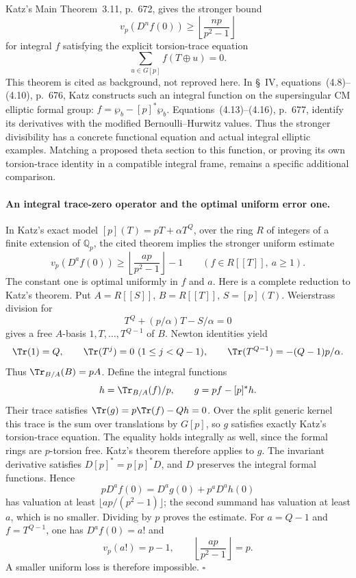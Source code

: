 \documentclass[11pt]{article}
\newcommand{\Q}{\mathbb Q}\newcommand{\C}{\mathbb C}\newcommand{\Z}{\mathbb Z}\newcommand{\R}{\mathbb R}\newcommand{\A}{\mathbb A}\newcommand{\OO}{\mathcal O}
\theoremstyle{definition}\newtheorem{definition}[theorem]{Definition}\newtheorem{remark}[theorem]{Remark}
\begin{document}
Katz's Main Theorem~3.11, p.~672, gives the stronger bound
\[
 v_p(D^nf(0))\geq\left\lfloor\frac{np}{p^2-1}\right\rfloor
\]
for integral $f$ satisfying the explicit torsion-trace equation
\[
 \sum_{u\in G[p]}f(T\mathbin\oplus u)=0.
\]
This theorem is cited as background, not reproved here.
In \S~IV, equations~(4.8)--(4.10), p.~676, Katz constructs such an
integral function on the supersingular CM elliptic formal group:
$f=\wp_b-[p]^*\wp_b$. Equations~(4.13)--(4.16), p.~677, identify
its derivatives with the modified Bernoulli--Hurwitz values.
Thus the stronger divisibility has a concrete functional equation
and actual integral elliptic examples. Matching a proposed theta
section to this function, or proving its own torsion-trace identity
in a compatible integral frame, remains a specific additional
comparison.

\paragraph{An integral trace-zero operator and the optimal uniform error one.}
In Katz's exact model $[p](T)=pT+\alpha T^Q$, over the ring $R$
of integers of a finite extension of $\Q_p$, the cited theorem
implies the stronger uniform estimate
\[
 v_p(D^af(0))\geq
       \left\lfloor\frac{ap}{p^2-1}\right\rfloor-1
       \qquad(f\in R[[T]],\ a\geq1).
\]
The constant one is optimal uniformly in $f$ and $a$.
Here is a complete reduction to Katz's theorem. Put
$A=R[[S]]$, $B=R[[T]]$, $S=[p](T)$. Weierstrass division for
\[
 T^Q+(p/\alpha)T-S/\alpha=0
\]
gives a free $A$-basis $1,T,\ldots,T^{Q-1}$ of $B$.
Newton identities yield
\[
 \Tr(1)=Q,\qquad \Tr(T^j)=0\ (1\leq j<Q-1),\qquad
 \Tr(T^{Q-1})=-(Q-1)p/\alpha.
\]
Thus $\Tr_{B/A}(B)=pA$. Define the integral functions
\[
 h=\Tr_{B/A}(f)/p,\qquad
 g=pf-[p]^*h.
\]
Their trace satisfies $\Tr(g)=p\Tr(f)-Qh=0$.
Over the split generic kernel this trace is the sum over translations
by $G[p]$, so $g$ satisfies exactly Katz's torsion-trace equation.
The equality holds integrally as well, since the formal rings are
$p$-torsion free. Katz's theorem therefore applies to $g$.
The invariant derivative satisfies $D[p]^*=p[p]^*D$, and $D$
preserves the integral formal functions. Hence
\[
 pD^af(0)=D^ag(0)+p^aD^ah(0)
\]
has valuation at least $\lfloor ap/(p^2-1)\rfloor$; the second
summand has valuation at least $a$, which is no smaller.
Dividing by $p$ proves the estimate. For $a=Q-1$ and
$f=T^{Q-1}$, one has $D^af(0)=a!$ and
\[
 v_p(a!)=p-1,
 \qquad\left\lfloor\frac{ap}{p^2-1}\right\rfloor=p.
\]
A smaller uniform loss is therefore impossible. $\square$
\end{document}
